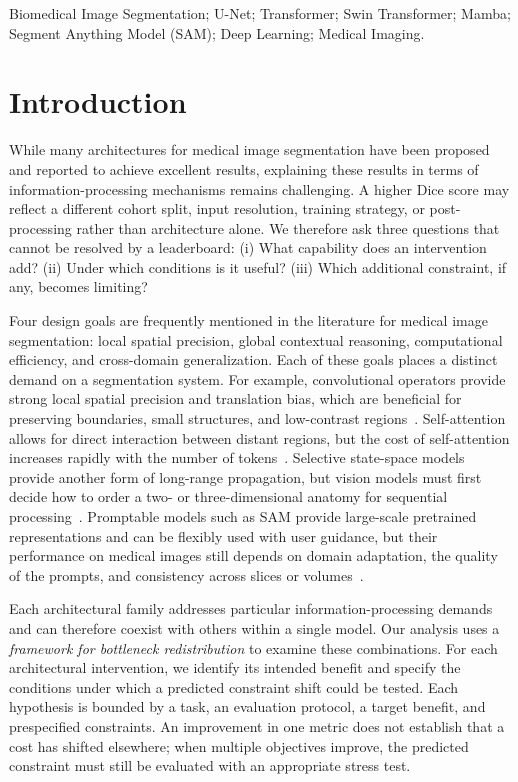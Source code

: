 \documentclass[5p,times,authoryear]{elsarticle}
\begin{document}
\begin{frontmatter}
\begin{keyword}
Biomedical Image Segmentation; U-Net; Transformer; Swin Transformer; Mamba; Segment Anything Model (SAM); Deep Learning; Medical Imaging.
\end{keyword}

\end{frontmatter}


\section{Introduction}

While many architectures for medical image segmentation have been proposed and reported to achieve excellent results, explaining these results in terms of information-processing mechanisms remains challenging. A higher Dice score may reflect a different cohort split, input resolution, training strategy, or post-processing rather than architecture alone. We therefore ask three questions that cannot be resolved by a leaderboard: (i) What capability does an intervention add? (ii) Under which conditions is it useful? (iii) Which additional constraint, if any, becomes limiting?

Four design goals are frequently mentioned in the literature for medical image segmentation: local spatial precision, global contextual reasoning, computational efficiency, and cross-domain generalization. Each of these goals places a distinct demand on a segmentation system. For example, convolutional operators provide strong local spatial precision and translation bias, which are beneficial for preserving boundaries, small structures, and low-contrast regions~\citep{ronneberger2015unet,oktay2018attentionunet,isensee2021nnu}. Self-attention allows for direct interaction between distant regions, but the cost of self-attention increases rapidly with the number of tokens~\citep{dosovitskiy2021vit,chen2021transunet,hatamizadeh2022unetr}. Selective state-space models provide another form of long-range propagation, but vision models must first decide how to order a two- or three-dimensional anatomy for sequential processing~\citep{gu2023mamba}. Promptable models such as SAM provide large-scale pretrained representations and can be flexibly used with user guidance, but their performance on medical images still depends on domain adaptation, the quality of the prompts, and consistency across slices or volumes~\citep{kirillov2023sam,ma2024medsam}.

Each architectural family addresses particular information-processing demands and can therefore coexist with others within a single model. Our analysis uses a \emph{framework for bottleneck redistribution} to examine these combinations. For each architectural intervention, we identify its intended benefit and specify the conditions under which a predicted constraint shift could be tested. Each hypothesis is bounded by a task, an evaluation protocol, a target benefit, and prespecified constraints. An improvement in one metric does not establish that a cost has shifted elsewhere; when multiple objectives improve, the predicted constraint must still be evaluated with an appropriate stress test.
\end{document}
